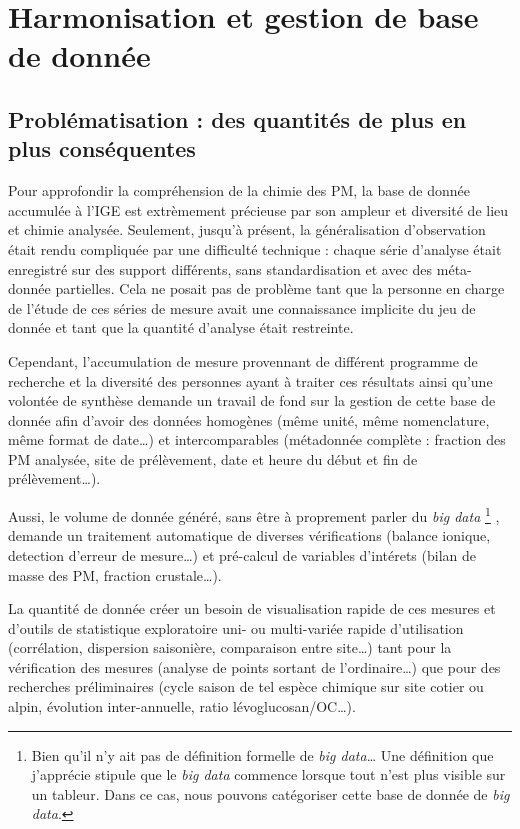 \section{Harmonisation et gestion de base de donnée}%
\label{sec:harmonisation_et_gestion_de_base_de_donnée}

\subsection{Problématisation : des quantités de plus en plus conséquentes}%
\label{sub:problématisation_des_quantités_de_plus_en_plus_conséquentes}

Pour approfondir la compréhension de la chimie des PM, la base de donnée accumulée à l'IGE
est extrèmement précieuse par son ampleur et diversité de lieu et chimie analysée.
Seulement, jusqu'à présent, la généralisation d'observation était rendu compliquée par une
difficulté technique : chaque série d'analyse était enregistré sur des support différents,
sans standardisation et avec des méta-donnée partielles. Cela ne posait pas de problème
tant que la personne en charge de l'étude de ces séries de mesure avait une connaissance
implicite du jeu de donnée et tant que la quantité d'analyse était restreinte.

Cependant, l'accumulation de mesure provennant de différent programme de recherche et la
diversité des personnes ayant à traiter ces résultats ainsi qu'une volontée de synthèse
demande un travail de fond sur la gestion de cette base de donnée afin d'avoir des données
homogènes (même unité, même nomenclature, même format de date…) et intercomparables
(métadonnée complète : fraction des PM analysée, site de prélèvement, date et heure du
début et fin de prélèvement…).

Aussi, le volume de donnée généré, sans être à proprement parler du \textit{big data}
\footnote{Bien qu'il n'y ait pas de définition formelle de \textit{big data}…  Une
    définition que j'apprécie stipule que le \textit{big data} commence lorsque tout
    n'est plus visible sur un tableur. Dans ce cas, nous pouvons catégoriser cette base de
donnée de \textit{big data}.}
, demande un traitement automatique de diverses vérifications (balance ionique, detection
d'erreur de mesure…) et pré-calcul de variables d'intérets (bilan de masse des PM,
fraction crustale…).

La quantité de donnée créer un besoin de visualisation rapide de ces mesures et
d'outils de statistique exploratoire uni- ou multi-variée rapide d'utilisation
(corrélation, dispersion saisonière, comparaison entre site…) tant pour la vérification
des mesures (analyse de points sortant de l'ordinaire…) que pour des recherches
préliminaires (cycle saison de tel espèce chimique sur site cotier ou alpin, évolution
inter-annuelle, ratio lévoglucosan/OC…).

